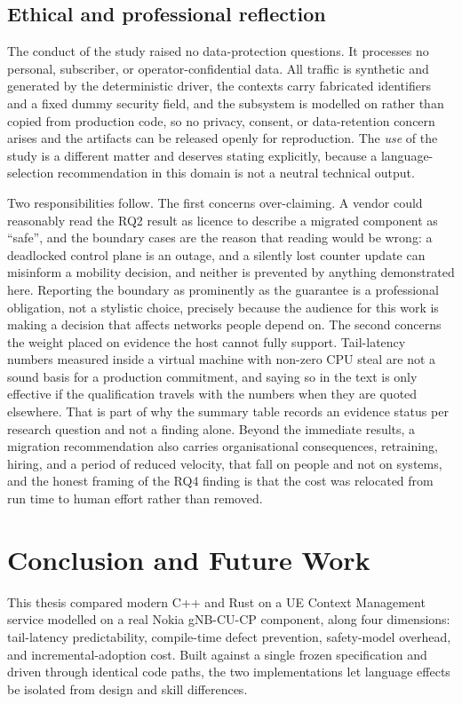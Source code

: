 \documentclass[english,twoside,openright,a4paper,censored,csm,software-track-2020]{HYthesisML}
\begin{document}
\section{Ethical and professional reflection}
The conduct of the study raised no data-protection questions. It processes no personal,
subscriber, or operator-confidential data. All traffic is synthetic and generated by the
deterministic driver, the contexts carry fabricated identifiers and a fixed dummy security
field, and the subsystem is modelled on rather than copied from production code, so no privacy,
consent, or data-retention concern arises and the artifacts can be released openly for
reproduction. The \emph{use} of the study is a different matter and deserves stating explicitly,
because a language-selection recommendation in this domain is not a neutral technical output.

Two responsibilities follow. The first concerns over-claiming. A vendor could reasonably read
the RQ2 result as licence to describe a migrated component as ``safe'', and the boundary cases
are the reason that reading would be wrong: a deadlocked control plane is an outage, and a
silently lost counter update can misinform a mobility decision, and neither is prevented by
anything demonstrated here. Reporting the boundary as prominently as the guarantee is a
professional obligation, not a stylistic choice, precisely because the audience for this work
is making a decision that affects networks people depend on. The second concerns the weight
placed on evidence the host cannot fully support. Tail-latency numbers measured inside a virtual
machine with non-zero CPU steal are not a sound basis for a production commitment, and saying so
in the text is only effective if the qualification travels with the numbers when they are quoted
elsewhere. That is part
of why the summary table records an evidence status per research question and not a
finding alone. Beyond the immediate results, a migration recommendation also carries
organisational consequences, retraining, hiring, and a period of reduced velocity, that fall
on people and not on systems, and the honest framing of the RQ4 finding is that the cost
was relocated from run time to human effort rather than removed.

\chapter{Conclusion and Future Work\label{chapter:conclusions}}

This thesis compared modern C++ and Rust on a UE Context Management service modelled on a real
Nokia gNB-CU-CP component, along four dimensions: tail-latency predictability, compile-time
defect prevention, safety-model overhead, and incremental-adoption cost. Built against a single
frozen specification and driven through identical code paths, the two implementations let
language effects be isolated from design and skill differences.
\end{document}
